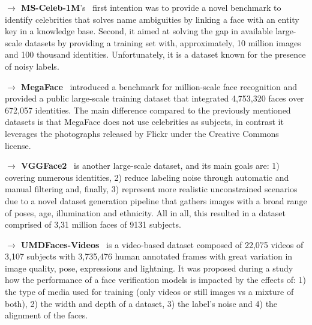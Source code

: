 \documentclass[class=report, crop=false, a4paper, 12pt]{standalone}
\begin{document}



\vspace{0.7\baselineskip}
\noindent\textbf{$\rightarrow$ MS-Celeb-1M}'s~\autocite{guoMSCeleb1MDatasetBenchmark2016} first intention was to provide a novel benchmark to identify celebrities that solves name ambiguities by linking a face with an entity key in a knowledge base. Second, it aimed at solving the gap in available large-scale datasets by providing a training set with, approximately, 10 million images and 100 thousand identities. Unfortunately, it is a dataset known for the presence of noisy labels. 


\vspace{0.7\baselineskip}
\noindent\textbf{$\rightarrow$ MegaFace}~\autocite{nechLevelPlayingField2017} introduced a benchmark for million-scale face recognition and provided a public large-scale training dataset that integrated 4,753,320 faces over 672,057 identities. The main difference compared to the previously mentioned datasets is that MegaFace does not use celebrities as subjects, in contrast it leverages the photographs released by Flickr under the Creative Commons license. 

\vspace{0.7\baselineskip}
\noindent\textbf{$\rightarrow$ VGGFace2}~\autocite{caoVGGFace2DatasetRecognising2018} is another large-scale dataset, and its main goals are: 1) covering numerous identities, 2) reduce labeling noise through automatic and manual filtering and, finally, 3) represent more realistic unconstrained scenarios due to a novel dataset generation pipeline that gathers images with a broad range of poses, age, illumination and ethnicity. All in all, this resulted in a dataset comprised of 3,31 million faces of 9131 subjects.

\vspace{0.7\baselineskip}
\noindent\textbf{$\rightarrow$ UMDFaces-Videos}~\autocite{bansalDonTsCNNbased2017} is a video-based dataset composed of 22,075 videos of 3,107 subjects with 3,735,476 human annotated frames with great variation in image quality, pose, expressions and lightning. It was proposed during a study how the performance of a face verification models is impacted by the effects of: 1) the type of media used for training (only videos or still images vs a mixture of both), 2) the width and depth of a dataset, 3) the label's noise and 4) the alignment of the faces.
\end{document}
